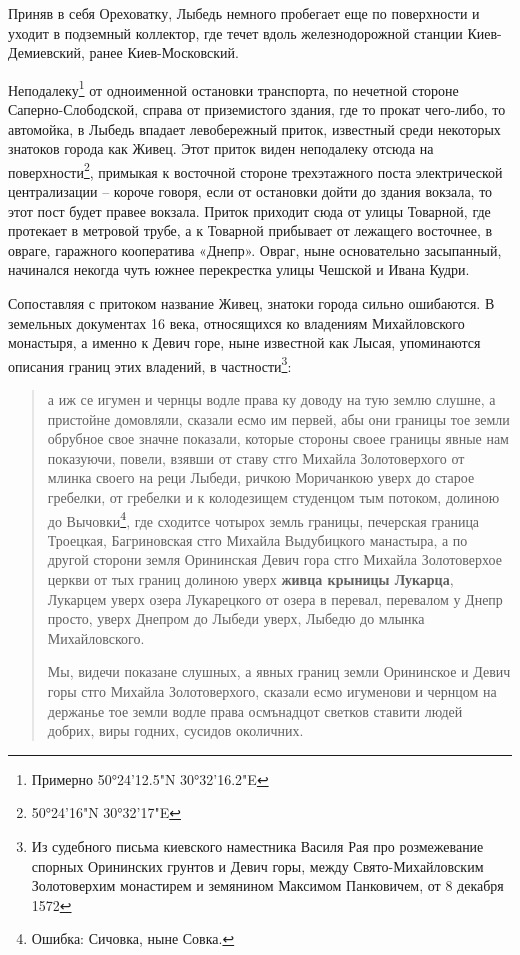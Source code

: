 Приняв в себя Ореховатку, Лыбедь немного пробегает еще по поверхности и уходит в подземный коллектор, где течет вдоль  железнодорожной станции Киев-Демиевский, ранее Киев-Московский.

Неподалеку\footnote{Примерно 50°24'12.5"N 30°32'16.2"E} от одноименной остановки транспорта, по нечетной стороне Саперно-Слободской, справа от приземистого здания, где то прокат чего-либо, то автомойка, в Лыбедь впадает левобережный приток, известный среди некоторых знатоков города как Живец. Этот приток виден неподалеку отсюда на поверхности\footnote{50°24'16"N 30°32'17"E}, примыкая к восточной стороне трехэтажного поста электрической централизации – короче говоря, если от остановки дойти до здания вокзала, то этот пост будет правее вокзала. Приток приходит сюда от улицы Товарной, где протекает в метровой трубе, а к Товарной прибывает от лежащего восточнее, в овраге, гаражного кооператива «Днепр». Овраг, ныне основательно засыпанный, начинался некогда чуть южнее перекрестка улицы Чешской и Ивана Кудри.

Сопоставляя с притоком название Живец, знатоки города сильно ошибаются. В земельных документах 16 века, относящихся ко владениям Михайловского монастыря, а именно к Девич горе,  ныне известной как Лысая, упоминаются описания границ этих владений, в частности\footnote{Из судебного письма киевского наместника Василя Рая про розмежевание спорных Орининских грунтов и Девич горы, между Свято-Михайловским
Золотоверхим монастирем и земянином Максимом Панковичем, от 8 декабря 1572}:

\begin{quotation}
а иж се игумен и чернцы водле права ку доводу на тую землю слушне, а пристойне домовляли, сказали есмо им первей, абы они границы тое земли обрубное свое значне показали, которые стороны своее границы явные нам показуючи, повели, взявши от ставу стго Михайла Золотоверхого от млинка своего на реци Лыбеди, ричкою Моричанкою уверх до старое гребелки, от гребелки и к колодезищем студенцом тым потоком, долиною до Вычовки\footnote{Ошибка: Сичовка, ныне Совка.}, где сходитсе чотырох земль границы,
печерская граница Троецкая, Багриновская стго Михайла Выдубицкого манастыра, а по другой сторони земля Орининская Девич гора стго Михайла Золотоверхое церкви от тых границ долиною уверх \textbf{живца крыницы Лукарца}, Лукарцем уверх озера Лукарецкого от озера в перевал, перевалом у Днепр просто, уверх Днепром до Лыбеди уверх, Лыбедю до млынка Михайловского.

Мы, видечи показане слушных, а явных границ земли Орининское и Девич горы стго Михайла Золотоверхого, сказали есмо игуменови и чернцом на держанье тое земли водле права осмънадцот светков ставити людей добрих, виры годних, сусидов околичних.\end{quotation}
 
